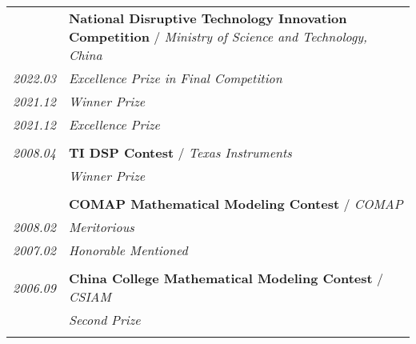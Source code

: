 \documentclass[paper=a4,fontsize=11pt]{scrartcl}
\begin{document}
\begin{longtable}{r|p{11cm}}
	
	~ & \textbf{National Disruptive Technology Innovation Competition}  / \emph{Ministry of Science and Technology, China}\\
	\emph{2022.03} & \emph{Excellence Prize in Final Competition}\\
	\emph{2021.12} & \emph{Winner Prize}\\
	\emph{2021.12} & \emph{Excellence Prize}\\
	\multicolumn{2}{c}{} \\
	
	
	
	\emph{2008.04} & \textbf{TI DSP Contest} / \emph{Texas Instruments} \\
	& \emph{Winner Prize}\\
	\multicolumn{2}{c}{} \\
	
	
	~ & \textbf{COMAP Mathematical Modeling Contest} / \emph{COMAP}\\
	\emph{2008.02} & \emph{Meritorious}\\
	
	
	\emph{2007.02} 	& \emph{Honorable Mentioned}\\
	\multicolumn{2}{c}{} \\
	
	
	\emph{2006.09} & \textbf{China College Mathematical Modeling Contest} / \emph{CSIAM}\\
	& \emph{Second Prize}\\
	\multicolumn{2}{c}{}
	
	
\end{longtable}




\end{document}
